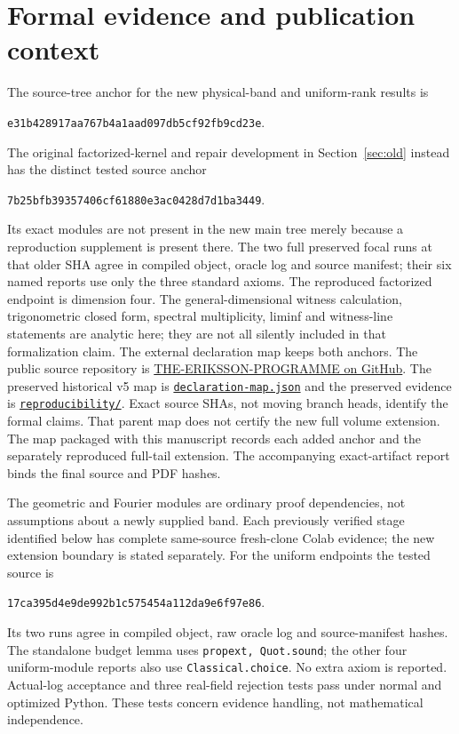 \documentclass[11pt]{article}
\begin{document}
\section{Formal evidence and publication context}
The source-tree anchor for the new physical-band and uniform-rank results is
\begin{center}\small\texttt{e31b428917aa767b4a1aad097db5cf92fb9cd23e}.\end{center}
The original factorized-kernel and repair development in
Section~\ref{sec:old} instead has the distinct tested source anchor
\begin{center}\small\texttt{7b25bfb39357406cf61880e3ac0428d7d1ba3449}.\end{center}
Its exact modules are not present in the new main tree merely because a
reproduction supplement is present there. The two full preserved focal runs
at that older SHA agree in compiled object, oracle log and source manifest;
their six named reports use only the three standard axioms. The reproduced
factorized endpoint is dimension four. The general-dimensional witness
calculation, trigonometric closed form, spectral multiplicity, liminf and
witness-line statements are analytic here; they are not all silently included
in that formalization claim. The external declaration map keeps both anchors. The public source repository is
\href{https://github.com/lluiseriksson/THE-ERIKSSON-PROGRAMME}{THE-ERIKSSON-PROGRAMME on GitHub}.
The preserved historical v5 map is
\href{https://github.com/lluiseriksson/THE-ERIKSSON-PROGRAMME/blob/d9e2a805796e6901dc9b5565f67f975cd5e41760/papers/flat-coarse-rank/v5-candidate/declaration-map.json}{\texttt{declaration-map.json}}
and the preserved evidence is
\href{https://github.com/lluiseriksson/THE-ERIKSSON-PROGRAMME/tree/e31b428917aa767b4a1aad097db5cf92fb9cd23e/reproducibility}{\texttt{reproducibility/}}. Exact source SHAs, not moving branch heads,
identify the formal claims. That parent map does not certify the new full volume extension. The map packaged with this manuscript records each added anchor and the separately reproduced full-tail extension. The accompanying exact-artifact report binds the final source and PDF hashes.

The geometric and Fourier modules are ordinary proof dependencies, not
assumptions about a newly supplied band. Each previously verified stage identified below has complete
same-source fresh-clone Colab evidence; the new extension boundary is stated separately. For the uniform endpoints the tested
source is
\begin{center}\small\texttt{17ca395d4e9de992b1c575454a112da9e6f97e86}.\end{center}
Its two runs
agree in compiled object, raw oracle log and source-manifest hashes. The
standalone budget lemma uses \texttt{propext, Quot.sound}; the other four
uniform-module reports also use \texttt{Classical.choice}. No extra axiom is
reported. Actual-log acceptance and three real-field rejection tests pass
under normal and optimized Python. These tests concern evidence handling,
not mathematical independence.
\end{document}
